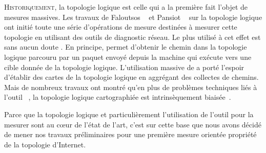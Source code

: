 \label{chap:traceroute}
\introformatting

\lettrine{H}{istoriquement}, la topologie logique est celle qui a la première
fait l'objet de mesures massives. Les travaux de Faloutsos
\etal~\cite{faloutsos1999power} et Pansiot \etal~\cite{280555} sur la topologie
logique ont initié toute une série d'opérations de mesure destinées à mesurer
cette topologie en utilisant des outils de diagnostic réseau. Le plus utilisé à
cet effet est sans aucun doute \traceroute. En principe, \traceroute permet
d'obtenir le chemin dans la topologie logique parcouru par un paquet envoyé
depuis la machine qui exécute \traceroute vers une cible donnée de la topologie
logique. L'utilisation massive de \traceroute a porté l'espoir d'établir des
cartes de la topologie logique en aggrégant des collectes de chemins. Mais de
nombreux travaux ont montré qu'en plus de problèmes techniques liés à l'outil
\traceroute~\cite{paristraceroute,pansiot2012,roughan201110}, la topologie
logique cartographiée est intrinsèquement
biaisée~\cite{LakhinaBCX03,AchlioptasCKM09,willinger,MDBP10,DallAstaABVV06,GuillaumeLM06,LatapyM08,roughan201110}.

Parce que la topologie logique et particulièrement l'utilisation de l'outil
\traceroute pour la mesurer sont au cœur de l'état de l'art, c'est sur cette
base que nous avons décidé de mener nos travaux préliminaires pour une première
mesure orientée propriété de la topologie d'Internet.

